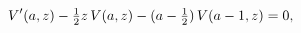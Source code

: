 \[\mathop{V\/}\nolimits'\!\left(a,z\right)-\tfrac{1}{2}z\mathop{V\/}\nolimits\!%
\left(a,z\right)-(a-\tfrac{1}{2})\mathop{V\/}\nolimits\!\left(a-1,z\right)=0,\]